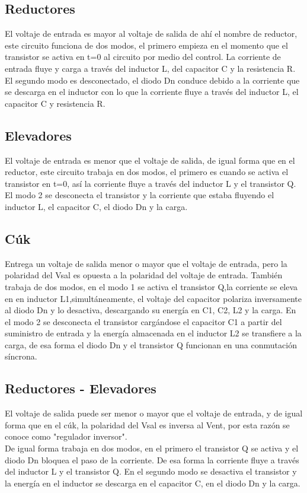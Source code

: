 \documentclass[12pt,a4paper]{article}
\begin{document}
\subsection{Reductores}
El voltaje de entrada es mayor al voltaje de salida de ahí el nombre de reductor, este circuito funciona de dos modos, el primero empieza en el momento que el transistor se activa en t=0 al circuito por medio del control. La corriente de entrada fluye y carga a través del inductor L, del capacitor C y la resistencia R. El segundo modo es desconectado, el diodo Dn conduce debido a la corriente que se descarga en el inductor con lo que la corriente fluye a través del inductor L, el capacitor C y resistencia R. 

\subsection{Elevadores}
El voltaje de entrada es menor que el voltaje de salida, de igual forma que en el reductor, este circuito trabaja en dos modos, el primero es cuando se activa el transistor en t=0, así la corriente fluye a través del inductor L y el transistor Q. El modo 2 se desconecta el transistor y la corriente que estaba fluyendo el inductor L, el capacitor C, el diodo Dn y la carga. 

\subsection{Cúk}
Entrega un voltaje de salida menor o mayor que el voltaje de entrada, pero la polaridad del Vsal es opuesta a la polaridad del voltaje de entrada. También trabaja de dos modos, en el modo 1 se activa el transistor Q,la corriente se eleva en en inductor L1,simultáneamente, el voltaje del capacitor polariza inversamente al diodo Dn y lo desactiva, descargando su energía en C1, C2, L2 y la carga. En el modo 2 se desconecta el transistor cargándose el capacitor C1 a partir del suministro de entrada y la energía almacenada en el inductor L2 se transfiere a la carga, de esa forma el diodo Dn y el transistor Q funcionan en una conmutación síncrona.  

\subsection{Reductores - Elevadores}
El voltaje de salida puede ser menor o mayor que el voltaje de entrada, y de igual forma que en el cúk, la polaridad del Vsal es inversa al Vent, por esta razón se conoce como "regulador inversor".\\
De igual forma trabaja en dos modos, en el primero el transistor Q se activa y el diodo Dn bloquea el paso de la corriente. De esa forma la corriente fluye a través del inductor L y el transistor Q. En el segundo modo se desactiva el transistor y la energía en el inductor se descarga en el capacitor C, en el diodo Dn y la carga. 
\end{document}
